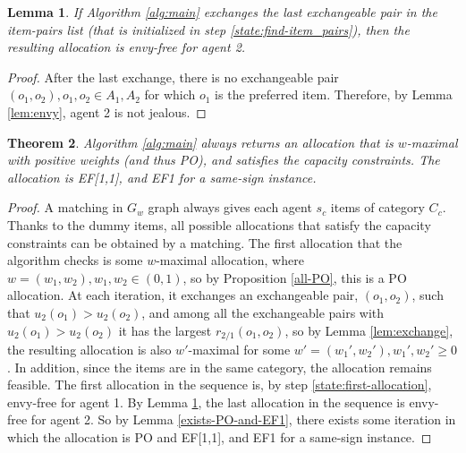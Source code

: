\documentclass[sigconf]{aamas}
\newtheorem{theorem}{Theorem}[section]
\newtheorem{lemma}[theorem]{Lemma}
\theoremstyle{definition}
\begin{document}
\begin{lemma}
\label{lem:first-and-last}
If Algorithm \ref{alg:main} exchanges the last exchangeable pair in the item-pairs list (that is initialized in step \ref{state:find-item_pairs}), then the resulting allocation is envy-free for agent 2.
\end{lemma}
\begin{proof}
After the last exchange, there is no exchangeable pair $(o_1,o_2), o_1,o_2\in A_1,A_2$ for which $o_1$ is the preferred item. Therefore, by Lemma \ref{lem:envy}, agent 2 is not jealous.
\end{proof}

\begin{theorem}
Algorithm \ref{alg:main} always returns an allocation that is $w$-maximal with positive weights (and thus PO), and satisfies the capacity constraints.
The allocation is EF[1,1], and EF1 for a same-sign instance.
\end{theorem}
\begin{proof}
A matching in $G_w$ graph always gives each agent $s_c$ items of category $C_c$. Thanks to the dummy items, all possible allocations that satisfy the capacity constraints can be obtained by a matching.
The first allocation that the algorithm checks is some $w$-maximal allocation, where $w=(w_1,w_2), w_1,w_2\in (0,1)$, so by Proposition \ref{all-PO}, this is a PO allocation.
At each iteration, it exchanges an exchangeable pair, $(o_1,o_2)$, such that $u_2(o_1)>u_2(o_2)$, and among all the exchangeable pairs with $u_2(o_1)>u_2(o_2)$ it has the largest $r_{2/1}(o_1,o_2)$, so by Lemma \ref{lem:exchange}, the resulting allocation is also $w'$-maximal for some $w'=(w_1',w_2'), w_1',w_2'\geq 0$.
In addition, since the items are in the same category, the allocation remains feasible.
The first allocation in the sequence is, by step \ref{state:first-allocation}, envy-free for agent 1.
By Lemma \ref{lem:first-and-last}, the last allocation in the sequence is 
envy-free for agent 2.
So by Lemma \ref{exists-PO-and-EF1}, there exists some iteration in which the allocation is PO and EF[1,1], and EF1 for a same-sign instance.
\end{proof}

\balance
\end{document}
